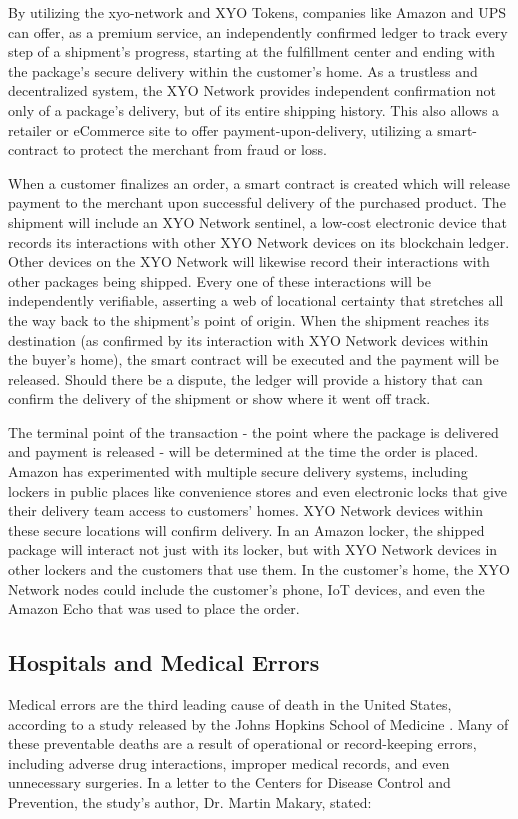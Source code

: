 \documentclass{article}
\begin{document}
By utilizing the \Gls{xyo-network} and XYO Tokens, companies like Amazon and UPS can offer, as a premium service, an independently confirmed ledger to track every step of a shipment's progress, starting at the fulfillment center and ending with the package's secure delivery within the customer's home. As a \gls{trustless} and decentralized system, the XYO Network provides independent confirmation not only of a package's delivery, but of its entire shipping history. This also allows a retailer or eCommerce site to offer payment-upon-delivery, utilizing a \gls{smart-contract} to protect the merchant from fraud or loss.

When a customer finalizes an order, a smart contract is created which will release payment to the merchant upon successful delivery of the purchased product. The shipment will include an XYO Network \Gls{sentinel}, a low-cost electronic device that records its interactions with other XYO Network devices on its blockchain ledger. Other devices on the XYO Network will likewise record their interactions with other packages being shipped. Every one of these interactions will be independently verifiable, asserting a web of locational \gls{certainty} that stretches all the way back to the shipment's point of origin. When the shipment reaches its destination (as confirmed by its interaction with XYO Network devices within the buyer's home), the smart contract will be executed and the payment will be released. Should there be a dispute, the ledger will provide a history that can confirm the delivery of the shipment or show where it went off track.

The terminal point of the transaction - the point where the package is delivered and payment is released - will be determined at the time the order is placed. Amazon has experimented with multiple secure delivery systems, including lockers in public places like convenience stores and even electronic locks that give their delivery team access to customers' homes. XYO Network devices within these secure locations will confirm delivery. In an Amazon locker, the shipped package will interact not just with its locker, but with XYO Network devices in other lockers and the customers that use them. In the customer's home, the XYO Network nodes could include the customer's phone, IoT devices, and even the Amazon Echo that was used to place the order.

\subsection{Hospitals and Medical Errors}
Medical errors are the third leading cause of death in the United States, according to a study released by the Johns Hopkins School of Medicine \cite{makary-medicalerrors}. Many of these preventable deaths are a result of operational or record-keeping errors, including adverse drug interactions, improper medical records, and even unnecessary surgeries. In a letter to the Centers for Disease Control and Prevention, the study's author, Dr. Martin Makary, stated:
\end{document}
